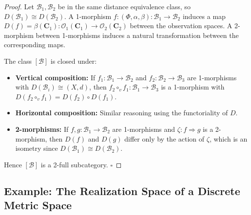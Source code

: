 \documentclass[11pt,a4paper]{article}
\begin{document}
\begin{proof}
Let $\mathcal{B}_1,\mathcal{B}_2$ be in the same distance equivalence class,
so $D(\mathcal{B}_1)\cong D(\mathcal{B}_2)$. A 1-morphism $f:(\Phi,\alpha,\beta):
\mathcal{B}_1\to\mathcal{B}_2$ induces a map
$D(f)=\beta(\mathbf{C}_1):\mathcal{O}_1(\mathbf{C}_1)\to\mathcal{O}_2(\mathbf{C}_2)$
between the observation spaces. A 2-morphism between 1-morphisms induces
a natural transformation between the corresponding maps.

The class $[\mathcal{B}]$ is closed under:
\begin{itemize}
\item \textbf{Vertical composition:} If $f_1:\mathcal{B}_1\to\mathcal{B}_2$
and $f_2:\mathcal{B}_2\to\mathcal{B}_3$ are 1-morphisms with
$D(\mathcal{B}_i)\cong(X,d)$, then $f_2\circ_v f_1:\mathcal{B}_1\to\mathcal{B}_3$
is a 1-morphism with $D(f_2\circ_v f_1)=D(f_2)\circ D(f_1)$.
\item \textbf{Horizontal composition:} Similar reasoning using the functoriality
of $D$.
\item \textbf{2-morphisms:} If $f,g:\mathcal{B}_1\to\mathcal{B}_2$ are
1-morphisms and $\zeta:f\Rightarrow g$ is a 2-morphism, then
$D(f)$ and $D(g)$ differ only by the action of $\zeta$, which is an
isometry since $D(\mathcal{B}_1)\cong D(\mathcal{B}_2)$.
\end{itemize}
Hence $[\mathcal{B}]$ is a 2-full subcategory. $\square$
\end{proof}

\subsection{Example: The Realization Space of a Discrete Metric Space}
\end{document}

